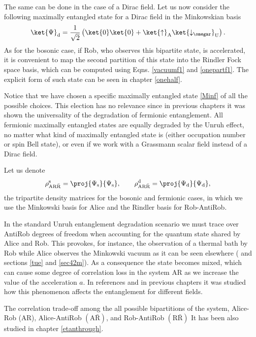 The same can be done in the case of a Dirac field. Let us now consider the
following maximally entangled state for a Dirac field in the Minkowskian
basis
\begin{equation}\label{Minf}
\ket{\Psi}_\text{d}=\frac{1}{\sqrt2}\left(\ket{0}\ket{0}+
\ket{\uparrow}_\text{A}\ket{\downarrow_\omegar}_\text{U}\right).
\end{equation}
As for the bosonic case, if Rob, who observes this bipartite state, is
accelerated, it is convenient to map the second partition of this state into
the Rindler Fock space basis, which can be computed using Eqns.
\eqref{vacuumf1} and \eqref{onepartf1}. The explicit form of such state
can be seen in chapter \ref{onehalf}.

Notice that we have chosen a specific maximally entangled state
\eqref{Minf} of all the possible choices. This election has no relevance
since in previous chapters it was shown the universality of the degradation of
fermionic entanglement. All fermionic maximally entangled states are
equally degraded by the Unruh effect, no matter what kind of maximally
entangled state is (either occupation number or spin Bell state), or even if
we work with a Grassmann scalar field instead of a Dirac field.

Let us denote
\begin{equation}\label{dens}
\rho^\text{s}_{\text{AR}\bar{\text{R}}}=\proj{\Psi_\text{s}}{\Psi_\text{s}},\qquad \rho^\text{d}_{\text{AR}\bar{\text{R}}}=\proj{\Psi_\text{d}}{\Psi_\text{d}},
\end{equation}
the tripartite density matrices for the bosonic and fermionic cases,  in
which we use the Minkowski basis for Alice and the Rindler basis for
Rob-AntiRob.

In the standard Unruh entanglement degradation scenario we must trace over AntiRob degrees of freedom when accounting
for the quantum state shared by Alice and Rob. This provokes, for
instance, the observation of a thermal bath by Rob while Alice observes
the Minkowski vacuum as it can be seen elsewhere
(\cite{Birrell,AlsingSchul} and sections \ref{tue} and \ref{sec42m}). As a consequence the state becomes
mixed, which can cause some degree of correlation loss in the system AR as
we increase the value of the acceleration $a$. In references
\cite{Alicefalls,AlsingSchul,Ditta,DiracDiscord} and in previous chapters it was
studied how this phenomenon affects the entanglement for different
fields.

The correlation
trade-off among the all possible bipartitions of the system, 
 Alice-Rob (AR),  Alice-AntiRob $(\text{A}\bar{\text{R}})$, and
  Rob-AntiRob $(\text{R} \bar{\text{R}})$ It has been also studied in chapter \ref{etanthrough}.
  
